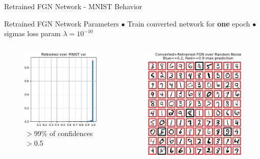 \documentclass{beamer}
\begin{document}
\begin{frame}{Retrained FGN Network - MNIST Behavior}
    
    \begin{block}{Retrained FGN Network Parameters}
    $\bullet$ Train converted network for \textbf{one} epoch $\bullet$ sigmas loss param $\lambda = 10^{-10}$
    \end{block}

    \begin{columns}
    \begin{column}{.5\textwidth}
    \begin{figure}
        \centering
        \includegraphics[width=.82\textwidth]{images/mnist-behavior/retrained-hist-val.png}
        \caption*{ $>$99\% of confidences $>$0.5}
    \end{figure}
    \end{column}
    \begin{column}{.5\textwidth}
    \begin{figure}
        \raggedright
        \vspace{-3mm}
        \includegraphics[width=.73\textwidth]{images/mnist-behavior/retrained-pred-val.png}

\end{figure}
\end{column}
\end{columns}
\end{frame}
\end{document}
